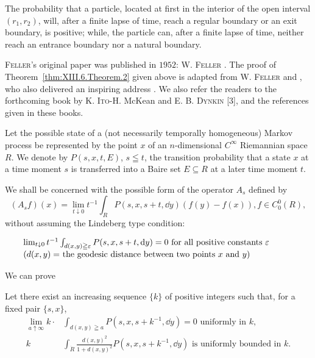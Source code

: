 The probability that a particle, located at first in the interior of the open interval $(r_{1}, r_{2})$, will, after a finite lapse of time, reach a regular boundary or an exit boundary, is positive; while, the particle can, after a finite lapse of time, neither reach an entrance boundary nor a natural boundary. 


\textsc{Feller}'s original paper was published in $1952$: W. \textsc{Feller} \cite{erdelyi57}. The proof of Theorem~\ref{thm:XIII.6.Theorem.2} given above is adapted from W. \textsc{Feller} \cite{erdelyi58} and \cite{erdelyi59}, who also delivered an inspiring address \cite{erdelyi60}. We also refer the readers to the forthcoming book by K. \textsc{Ito}-H. McKean \cite{hunt120} and E. B. \textsc{Dynkin} [$3$], and the references given in these books. 


\label{sec:XIII.7}

Let the possible state of a (not necessarily temporally homogeneous) Markov process be represented by the point $x$ of an $n$-dimensional $C^{\infty}$ Riemannian space $R$. We denote by $P(s, x, t, E)$, $s \leqq t$, the transition probability that a state $x$ at a time moment $s$ is transferred into a Baire set $E \subseteq R$ at a later time moment $t$. 

We shall be concerned with the possible form of the operator $A_{s}$ defined by 
\begin{equation}\label{eq:XIII.7.1}
\left(A _{s} f\right) (x) = \lim\limits _{t \downarrow 0} t ^{-1} \int_{R} P (s, x, s + t, \dd y) (f (y) - f (x)), f \in C _{0} ^{0} (R),
\end{equation}
without assuming the Lindeberg type condition: 

\begin{equation}\label{eq:XIII.7.2}
\begin{minipage}[b]{0.92\linewidth}
$\lim\limits_{t \downarrow 0} t^{-1} \int_{d(x, y) \geqq \varepsilon} P(s, x, s + t, \dd y) = 0$ for all positive constants $\varepsilon$ \\
$(d(x,y) =$ the geodesic distance between two points $x$ and $y)$
\end{minipage}
\end{equation}


We can prove 

\begin{theoremu} Let there exist an increasing sequence $\{k\}$ of positive integers such that, for a fixed pair $\{s, x\}$, 
\begin{align}
\lim\limits _{a \uparrow \infty} k \cdot& \int_{d (x, y) \geqq a} P (s, x, s + k ^{-1}, \dd y) = 0 \text{ uniformly in } k, \label{eq:XIII.7.3} \\
k& \int_ {\dot {R}} \frac {d (x , y) ^{2}}{1 + d (x , y) ^{2}} P (s, x, s + k ^{-1}, \dd y) \text{ is uniformly bounded in } k. \label{eq:XIII.7.4}
\end{align}
\end{theoremu}

